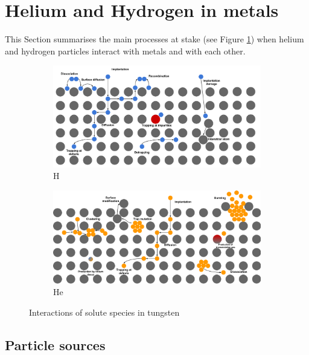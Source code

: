 \section{Helium and Hydrogen in metals}

This Section summarises the main processes at stake (see Figure \ref{fig: helium and hydrogen in metals sketch}) when helium and hydrogen particles interact with metals and with each other.

\begin{figure}[h!]
    \begin{subfigure}{0.9\linewidth}
        \includegraphics[width=\linewidth]{Figures/Chapter1/HI transport sketch.pdf}
        \caption{H}
    \end{subfigure}
    \begin{subfigure}{0.9\linewidth}
        \includegraphics[width=\linewidth]{Figures/Chapter1/He transport sketch.pdf}
        \caption{He}
    \end{subfigure}
    \caption{Interactions of solute species in tungsten}
    \label{fig: helium and hydrogen in metals sketch}
\end{figure}

\subsection{Particle sources}


